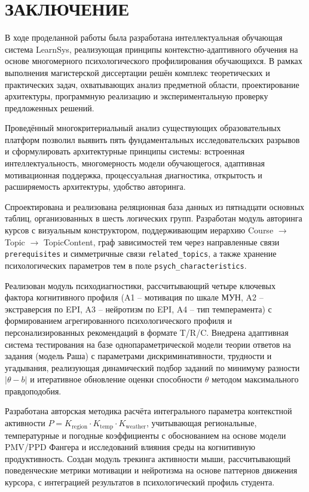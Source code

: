 \documentclass[a4paper,12pt]{article}
\begin{document}
\section*{\centering ЗАКЛЮЧЕНИЕ}

В ходе проделанной работы была разработана интеллектуальная обучающая система LearnSys, реализующая принципы контекстно-адаптивного обучения на основе многомерного психологического профилирования обучающихся. В рамках выполнения магистерской диссертации решён комплекс теоретических и практических задач, охватывающих анализ предметной области, проектирование архитектуры, программную реализацию и экспериментальную проверку предложенных решений.

Проведённый многокритериальный анализ существующих образовательных платформ позволил выявить пять фундаментальных исследовательских разрывов и сформулировать архитектурные принципы системы: встроенная интеллектуальность, многомерность модели обучающегося, адаптивная мотивационная поддержка, процессуальная диагностика, открытость и расширяемость архитектуры, удобство авторинга.

Спроектирована и реализована реляционная база данных из пятнадцати основных таблиц, организованных в шесть логических групп. Разработан модуль авторинга курсов с визуальным конструктором, поддерживающим иерархию Course $\to$ Topic $\to$ TopicContent, граф зависимостей тем через направленные связи \texttt{prerequisites} и симметричные связи \texttt{related\_topics}, а также хранение психологических параметров тем в поле \texttt{psych\_characteristics}.

Реализован модуль психодиагностики, рассчитывающий четыре ключевых фактора когнитивного профиля (A1 -- мотивация по шкале МУН, A2 -- экстраверсия по EPI, A3 -- нейротизм по EPI, A4 -- тип темперамента) с формированием агрегированного психологического профиля и персонализированных рекомендаций в формате T/R/C. Внедрена адаптивная система тестирования на базе однопараметрической модели теории ответов на задания (модель Раша) с параметрами дискриминативности, трудности и угадывания, реализующая динамический подбор заданий по минимуму разности $|\theta - b|$ и итеративное обновление оценки способности $\theta$ методом максимального правдоподобия.

Разработана авторская методика расчёта интегрального параметра контекстной активности $P = K_{\text{region}} \cdot K_{\text{temp}} \cdot K_{\text{weather}}$, учитывающая региональные, температурные и погодные коэффициенты с обоснованием на основе модели PMV/PPD Фангера и исследований влияния среды на когнитивную продуктивность. Создан модуль трекинга активности мыши, рассчитывающий поведенческие метрики мотивации и нейротизма на основе паттернов движения курсора, с интеграцией результатов в психологический профиль студента.
\end{document}
